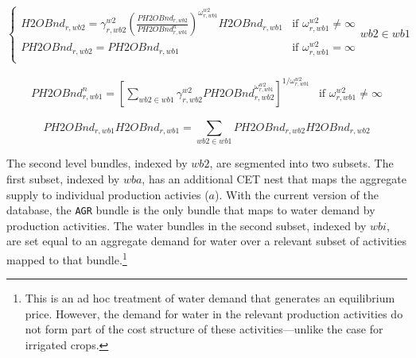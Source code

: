 \documentclass[11pt,letterpaper]{report}
\begin{document}
\begin{equation}
\label{eq:h2obnd2}
\begin{cases}
   \mathit{H2OBnd}_{r,\mathit{wb2}} =
      \gamma^{\mathit{w2}}_{r,\mathit{wb2}}
      \left( \frac{\mathit{PH2OBnd}_{r,\mathit{wb2}}}
         {\mathit{PH2OBnd}^n_{r,\mathit{wb1}}}
      \right)^{\omega^{\mathit{w2}}_{r,\mathit{wb1}}}
      \mathit{H2OBnd}_{r,\mathit{wb1}}
   & \textrm{if } \omega^{\mathit{w2}}_{r,\mathit{wb1}} \ne \infty \\
   \mathit{PH2OBnd}_{r,\mathit{wb2}} = \mathit{PH2OBnd}_{r,\mathit{wb1}}
   & \textrm{if } \omega^{\mathit{w2}}_{r,\mathit{wb1}} = \infty \\
\end{cases} {\mathit{wb2} \in \mathit{wb1}}
\end{equation}

\begin{equation}
\label{eq:ph2obndndx1}
\begin{array}{*{20}{l}}
\mathit{PH2OBnd}^n_{r,\mathit{wb1}} =
   \left[ \sum_{\mathit{wb2} \in \mathit{wb1}}{
   \gamma^{\mathit{w2}}_{r,\mathit{wb2}}
   \mathit{PH2OBnd}_{r,\mathit{wb2}}^{\omega^{\mathit{w2}}_{r,\mathit{wb1}}}
   }\right]^{1/\omega^{\mathit{w2}}_{r,\mathit{wb1}}}
& \textrm{if } \omega^{\mathit{w2}}_{r,\mathit{wb1}} \ne \infty
\end{array}
\end{equation}

\begin{equation}
\label{eq:ph2obnd1}
\mathit{PH2OBnd}_{r,\mathit{wb1}} \mathit{H2OBnd}_{r,\mathit{wb1}} =
   \sum_{\mathit{wb2}\in \mathit{wb1}}{
      \mathit{PH2OBnd}_{r,\mathit{wb2}} \mathit{H2OBnd}_{r,\mathit{wb2}}
   }
\end{equation}

The second level bundles, indexed by $\mathit{wb2}$, are segmented into two
subsets. The first subset, indexed by $\mathit{wba}$, has an additional CET nest
that maps the aggregate supply to individual production activies ($a$). With the
current version of the database, the \texttt{AGR} bundle is the only bundle that
maps to water demand by production activities. The water bundles in the second
subset, indexed by $\mathit{wbi}$, are set equal to an aggregate demand for
water over a relevant subset of activities mapped to that
bundle.\footnote{This is an ad hoc treatment of water demand that generates an
equilibrium price. However, the demand for water in the relevant production
activities do not form part of the cost structure of these activities---unlike
the case for irrigated crops.}
\end{document}
